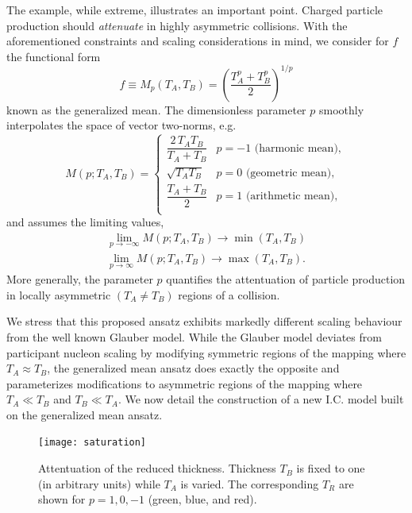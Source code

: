 \documentclass[aps,prc,reprint,amsmath,nofootinbib]{revtex4-1}
\begin{document}
The example, while extreme, illustrates an important point. Charged particle production should \emph{attenuate} in highly asymmetric collisions. With the aforementioned
constraints and scaling considerations in mind, we consider for $f$ the functional form
\begin{equation}
 f \equiv M_p(T_A,T_B) = \left(\frac{T_A^p + T_B^p}{2} \right) ^{1/p}
\end{equation}
known as the generalized mean. The dimensionless parameter $p$ smoothly interpolates the space of vector two-norms, e.g.
\begin{equation}
  M(p; T_A, T_B) =
  \begin{cases}
    \dfrac{2\, T_A T_B}{T_A + T_B} & p = -1 \text{ (harmonic mean)}, \\[2ex]
    \sqrt{T_A T_B} & p = 0 \text{ (geometric mean)}, \\[2ex]
    \dfrac{T_A + T_B}{2} & p = 1 \text{ (arithmetic mean)}, \\[2ex]
  \end{cases}
\end{equation}
and assumes the limiting values,
\begin{eqnarray}
 \lim\limits_{p\rightarrow -\infty}M(p;T_A,T_B) \rightarrow \min{(T_A,T_B)} \\
 \lim\limits_{p\rightarrow \infty}M(p;T_A,T_B) \rightarrow \max{(T_A,T_B)}.
\end{eqnarray}
More generally, the parameter $p$ quantifies the attentuation of particle production in locally asymmetric $(T_A \ne T_B)$ regions of a collision. 

We stress that this proposed ansatz exhibits markedly different scaling behaviour from the well known Glauber model. While the Glauber model deviates from participant
nucleon scaling by modifying symmetric regions of the mapping where $T_A \approx T_B$, the generalized mean ansatz does exactly the opposite and parameterizes 
modifications to asymmetric regions of the mapping where $T_A \ll T_B$ and $T_B \ll T_A$. We now detail the construction of a new I.C. model built on the generalized mean ansatz.

\begin{figure}
 \texttt{[image: saturation]}
\caption{\label{fig:saturation} Attentuation of the reduced thickness. Thickness $T_B$ is fixed to one (in arbitrary units) while $T_A$ is varied. The corresponding $T_R$ are shown for 
 $p=1,0,-1$ (green, blue, and red).}
\end{figure}
\end{document}
